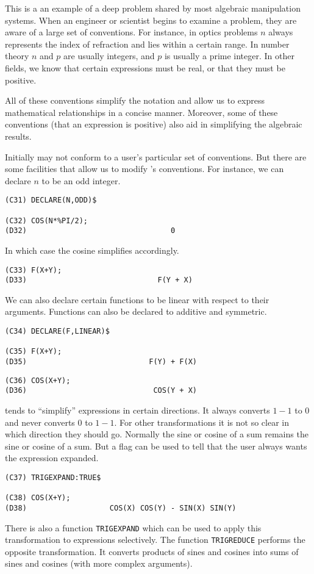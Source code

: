 This is a an example of a deep problem shared by most algebraic
manipulation systems.  When an engineer or scientist begins to examine a
problem, they are aware of a large set of conventions.  For instance, in
optics problems $n$ always represents the index of refraction and lies
within a certain range.  In number theory $n$ and $p$ are usually integers,
and $p$ is usually a prime integer.  In other fields, we know that certain
expressions must be real, or that they must be positive.

All of these conventions simplify the notation and allow us to express
mathematical relationships in a concise manner.  Moreover, some of these
conventions (that an expression is positive) also aid in simplifying the
algebraic results.

Initially {\Macsyma} may not conform to a user's particular set of conventions.
But there are some facilities that allow us to modify {\Macsyma}'s conventions.
For instance, we can declare $n$ to be an odd integer.
\begin{verbatim}
(C31) DECLARE(N,ODD)$

(C32) COS(N*%PI/2);
(D32)                                 0
\end{verbatim}
In which case the cosine simplifies accordingly.
\begin{verbatim}
(C33) F(X+Y);
(D33)                              F(Y + X)
\end{verbatim}
We can also declare certain functions to be linear with respect to
their arguments.  Functions can also be declared to additive and symmetric.
\begin{verbatim}
(C34) DECLARE(F,LINEAR)$

(C35) F(X+Y);
(D35)                            F(Y) + F(X)
\end{verbatim}
\begin{verbatim}
(C36) COS(X+Y);
(D36)                             COS(Y + X)
\end{verbatim}
{\Macsyma} tends to ``simplify'' expressions in certain directions.  It
always converts $1-1$ to $0$ and never converts $0$ to $1-1$.  For other
transformations it is not so clear in which direction they should go.  
Normally the sine or cosine of a sum remains the sine or cosine of a 
sum.  But a flag can be used to tell {\Macsyma} that the user always
wants the expression expanded. 
\begin{verbatim}
(C37) TRIGEXPAND:TRUE$

(C38) COS(X+Y);
(D38)                   COS(X) COS(Y) - SIN(X) SIN(Y)
\end{verbatim}
\noindent
There is also a function {\tt TRIGEXPAND} which can be used to apply this
transformation to expressions selectively.  The function {\tt TRIGREDUCE} 
performs the opposite transformation.  It converts products of sines and
cosines into sums of sines and cosines (with more complex arguments).  

